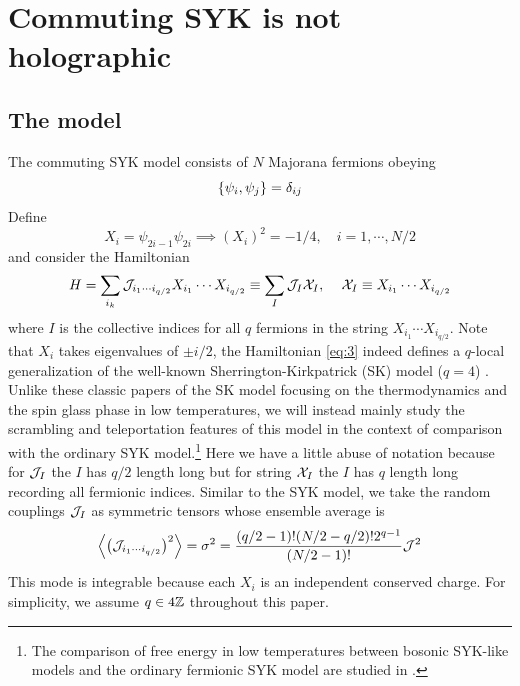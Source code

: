 \documentclass[11pt]{article}
\renewcommand{\>}{\rangle}
\newcommand{\<}{\langle}
\begin{document}
\section{Commuting SYK is not holographic} \label{sec2}

\subsection{The model}

The commuting SYK model consists of $N$ Majorana fermions obeying 
\begin{equation}
\{\psi_{i},\psi_{j}\}=\delta_{ij}
\end{equation}
Define
\begin{equation}
X_{i}=\psi_{2i-1}\psi_{2i}\implies(X_{i})^{2}=-1/4,\quad i=1,\cdots,N/2
\end{equation}
and consider the Hamiltonian
\begin{equation}
H=\sum_{i_{k}}\mathcal{J}_{i_{1}\cdots i_{q/2}}X_{i_{1}}\cdots X_{i_{q/2}}\equiv\sum_{I}\mathcal{J}_{I}\mathcal{X}_{I},\quad\,\mathcal{X}_{I}\equiv X_{i_{1}}\cdots X_{i_{q/2}}\label{eq:3}
\end{equation}
where $I$ is the collective indices for all $q$ fermions in the
string $X_{i_{1}}\cdots X_{i_{q/2}}$. Note that $X_i$ takes eigenvalues of $\pm i/2$, the Hamiltonian \eqref{eq:3} indeed defines a $q$-local generalization \cite{derrida1980random, gardner1985spin, kirkpatrick1987dynamics} of the well-known Sherrington-Kirkpatrick (SK) model ($q=4$) \cite{sherrington1975solvable, thouless1977solution, parisi1979infinite}. Unlike these classic papers of the SK model focusing on the thermodynamics and the spin glass phase in low temperatures, we will instead mainly study the scrambling and teleportation features of this model in the context of comparison with the ordinary SYK model.\footnote{The comparison of free energy in low temperatures between bosonic SYK-like models and the ordinary fermionic SYK model are studied in \cite{Baldwin:2019dki}.}  Here we have a little abuse
of notation because for $\mathcal{J}_{I}$ the $I$ has $q/2$ length long
but for string $\mathcal{X}_{I}$ the $I$ has $q$ length long recording
all fermionic indices. Similar to the SYK model, we take the random couplings
$\mathcal{J}_{I}$ as symmetric tensors whose ensemble average is 
\begin{equation}
\left\langle \left(\mathcal{J}_{i_{1}\cdots i_{q/2}}\right)^{2}\right\rangle=\sigma^{2}=\frac{(q/2-1)!(N/2-q/2)!2^{q-1}}{(N/2-1)!}\mathcal{J}^{2}\label{eq:4}
\end{equation}
This mode is integrable because each $X_{i}$ is an independent conserved
charge. For simplicity, we assume $q\in4\mathbb{Z}$ throughout this paper. 
\end{document}
